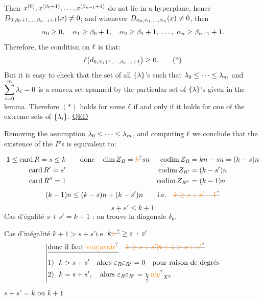 Then $x^{(0)},x^{(\beta_0+1)},\ldots,x^{(\beta_{n-1}+1)}$ do not lie in a hyperplane, hence
$D_{0,\beta_0+1,\ldots,\beta_{n-1}+1}(x)\ne0$; and whenever $D_{\alpha_0,\alpha_1,\ldots,\alpha_n}(x)\ne0$, then
\[
 \handwritten{\alpha}_0\geq0,\quad\handwritten{\alpha}_1\geq\handwritten{\beta}_0+1,\quad
 \handwritten{\alpha}_2\geq\handwritten{\beta}_1+1,\ \ldots,\ \handwritten{\alpha}_n\geq\handwritten{\beta}_{n-1}+1.
\]
Therefore, the condition on $\ell$ is that:
\begingroup\makeatletter\tagsleft@true\makeatother
\[
 \ell\bigl(d_{0,\beta_0+1,\ldots,\beta_{n-1}+1}\bigr)\geq0.\tag*{(*)}
\]
\endgroup
But it is easy to check that the set of all $\{\lambda\}$'s such that $\lambda_0\leq\cdots\leq\lambda_m$
and $\displaystyle\sum_{i=0}^{m}\lambda_i=0$ is a convex set spanned by the particular set of
$\{\lambda\}$'s given in the lemma. Therefore $(*)$ holds for some $\ell$ if and only
if it holds for one of the extreme sets of $\{\lambda_i\}$. \quad\uline{QED}

Removing the assumption $\lambda_0\leq\cdots\leq\lambda_m$, and computing $\ell$ we
conclude that the existence of the $P$'s is equivalent to:

\[
\begin{aligned}
 1\leq\operatorname{card}R=s\leq k&\qquad\text{donc}\quad\dim Z_R=\deleted{\unsure{k}}sn
   &\operatorname{codim} Z_R&=kn-sn=(k-s)n\\
 \operatorname{card}R'=s'&&\operatorname{codim} Z_{R'}&=(k-s')n\\
 \operatorname{card}R''=1&&\operatorname{codim} Z_{R''}&=(k-1)n
\end{aligned}
\]
\[
 (k-1)n\leq(k-s)n+(k-s')n\qquad\text{i.e.}\quad\deleted{\unsure{k\geq s+s'-1}}
\]
\[
 \boxed{s+s'\leq k+1}
\]
Cas d'égalité \quad \uline{$s+s'=k+1$} : on trouve la diagonale $\delta_k$.

Cas d'inégalité \qquad $k+1>s+s'$\quad i.e. $k\deleted{\unsure{>}}\geq s+s'$
\[
 \left|\begin{aligned}
 &\deleted{\text{donc il faut }\text{\unsure{voir|avoir}}}\quad\deleted{\unsure{k\geq s+s'|k+1>s+s'}}\\
 &\text{1) }\ k>s+s'\quad\text{alors }\varepsilon_R\varepsilon_{R'}=0\quad\text{pour raison de degrés}\\
 &\text{2) }\ k=s+s',\quad\text{alors }\varepsilon_R\varepsilon_{R'}=\underset{?}{\chi}\,\unsure{\eta|y}_{X^k}
 \end{aligned}\right.
\]
$s+s'=k$ ou $k+1$

